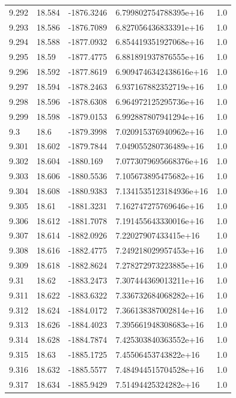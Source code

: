 \begin{tabular}{lllll}
9.292 & 18.584 & -1876.3246 & 6.799802754788395e+16 & 1.0 \\
9.293 & 18.586 & -1876.7089 & 6.827056436833391e+16 & 1.0 \\
9.294 & 18.588 & -1877.0932 & 6.854419351927068e+16 & 1.0 \\
9.295 & 18.59 & -1877.4775 & 6.881891937876555e+16 & 1.0 \\
9.296 & 18.592 & -1877.8619 & 6.9094746342438616e+16 & 1.0 \\
9.297 & 18.594 & -1878.2463 & 6.937167882352719e+16 & 1.0 \\
9.298 & 18.596 & -1878.6308 & 6.964972125295736e+16 & 1.0 \\
9.299 & 18.598 & -1879.0153 & 6.992887807941294e+16 & 1.0 \\
9.3 & 18.6 & -1879.3998 & 7.020915376940962e+16 & 1.0 \\
9.301 & 18.602 & -1879.7844 & 7.049055280736489e+16 & 1.0 \\
9.302 & 18.604 & -1880.169 & 7.0773079695668376e+16 & 1.0 \\
9.303 & 18.606 & -1880.5536 & 7.105673895475682e+16 & 1.0 \\
9.304 & 18.608 & -1880.9383 & 7.1341535123184936e+16 & 1.0 \\
9.305 & 18.61 & -1881.3231 & 7.162747275769646e+16 & 1.0 \\
9.306 & 18.612 & -1881.7078 & 7.191455643330016e+16 & 1.0 \\
9.307 & 18.614 & -1882.0926 & 7.22027907433415e+16 & 1.0 \\
9.308 & 18.616 & -1882.4775 & 7.249218029957453e+16 & 1.0 \\
9.309 & 18.618 & -1882.8624 & 7.278272973223885e+16 & 1.0 \\
9.31 & 18.62 & -1883.2473 & 7.307444369013211e+16 & 1.0 \\
9.311 & 18.622 & -1883.6322 & 7.336732684068282e+16 & 1.0 \\
9.312 & 18.624 & -1884.0172 & 7.366138387002814e+16 & 1.0 \\
9.313 & 18.626 & -1884.4023 & 7.395661948308683e+16 & 1.0 \\
9.314 & 18.628 & -1884.7874 & 7.425303840363552e+16 & 1.0 \\
9.315 & 18.63 & -1885.1725 & 7.45506453743822e+16 & 1.0 \\
9.316 & 18.632 & -1885.5577 & 7.484944515704528e+16 & 1.0 \\
9.317 & 18.634 & -1885.9429 & 7.51494425324282e+16 & 1.0 \\

\end{tabular}
